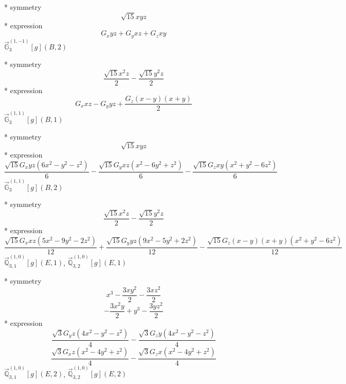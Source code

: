 \documentclass[fleqn,8pt]{jsarticle}
\begin{document}
\noindent\quad ** symmetry
\begin{dmath*}
\sqrt{15} x y z
\end{dmath*}
\noindent\quad ** expression
\begin{dmath*}
G_{x} y z + G_{y} x z + G_{z} x y
\end{dmath*}
\noindent\quad $\vec{\mathbb{G}}_{3}^{(1,-1)}[g](B,2)$

\noindent\quad ** symmetry
\begin{dmath*}
\frac{\sqrt{15} x^{2} z}{2} - \frac{\sqrt{15} y^{2} z}{2}
\end{dmath*}
\noindent\quad ** expression
\begin{dmath*}
G_{x} x z - G_{y} y z + \frac{G_{z} \left(x - y\right) \left(x + y\right)}{2}
\end{dmath*}
\noindent\quad $\vec{\mathbb{G}}_{3}^{(1,1)}[g](B,1)$

\noindent\quad ** symmetry
\begin{dmath*}
\sqrt{15} x y z
\end{dmath*}
\noindent\quad ** expression
\begin{dmath*}
\frac{\sqrt{15} G_{x} y z \left(6 x^{2} - y^{2} - z^{2}\right)}{6} - \frac{\sqrt{15} G_{y} x z \left(x^{2} - 6 y^{2} + z^{2}\right)}{6} - \frac{\sqrt{15} G_{z} x y \left(x^{2} + y^{2} - 6 z^{2}\right)}{6}
\end{dmath*}
\noindent\quad $\vec{\mathbb{G}}_{3}^{(1,1)}[g](B,2)$

\noindent\quad ** symmetry
\begin{dmath*}
\frac{\sqrt{15} x^{2} z}{2} - \frac{\sqrt{15} y^{2} z}{2}
\end{dmath*}
\noindent\quad ** expression
\begin{dmath*}
\frac{\sqrt{15} G_{x} x z \left(5 x^{2} - 9 y^{2} - 2 z^{2}\right)}{12} + \frac{\sqrt{15} G_{y} y z \left(9 x^{2} - 5 y^{2} + 2 z^{2}\right)}{12} - \frac{\sqrt{15} G_{z} \left(x - y\right) \left(x + y\right) \left(x^{2} + y^{2} - 6 z^{2}\right)}{12}
\end{dmath*}
\noindent\quad $\vec{\mathbb{Q}}_{3,1}^{(1,0)}[g](E,1)$, $\vec{\mathbb{Q}}_{3,2}^{(1,0)}[g](E,1)$

\noindent\quad ** symmetry
\begin{dmath*}
x^{3} - \frac{3 x y^{2}}{2} - \frac{3 x z^{2}}{2}
\end{dmath*}
\begin{dmath*}
- \frac{3 x^{2} y}{2} + y^{3} - \frac{3 y z^{2}}{2}
\end{dmath*}
\noindent\quad ** expression
\begin{dmath*}
\frac{\sqrt{3} G_{y} z \left(4 x^{2} - y^{2} - z^{2}\right)}{4} - \frac{\sqrt{3} G_{z} y \left(4 x^{2} - y^{2} - z^{2}\right)}{4}
\end{dmath*}
\begin{dmath*}
\frac{\sqrt{3} G_{x} z \left(x^{2} - 4 y^{2} + z^{2}\right)}{4} - \frac{\sqrt{3} G_{z} x \left(x^{2} - 4 y^{2} + z^{2}\right)}{4}
\end{dmath*}
\noindent\quad $\vec{\mathbb{Q}}_{3,1}^{(1,0)}[g](E,2)$, $\vec{\mathbb{Q}}_{3,2}^{(1,0)}[g](E,2)$
\end{document}
